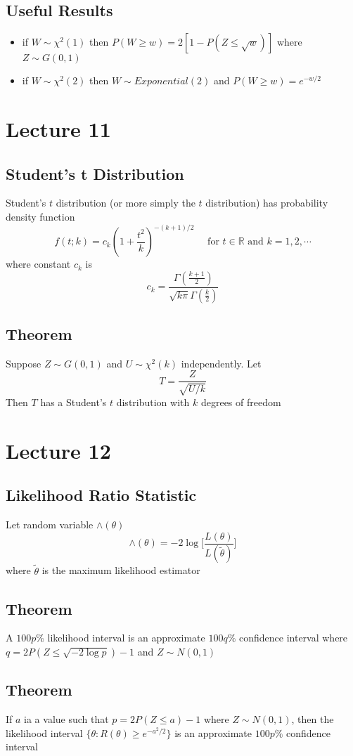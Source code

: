 \documentclass[11pt]{article}
\newcommand{\R}{{\mathbb{R}}}
\begin{document}
\subsection*{Useful Results}
\begin{itemize}
  \item if $W\sim\chi^2(1)$ then $P(W\geq w) = 2[1-P(Z\leq\sqrt{w})]$ where $Z\sim G(0,1)$
  \item if $W\sim\chi^2(2)$ then $W\sim Exponential(2)$ and $P(W\geq w) = e^{-w/2}$
\end{itemize}

\section{Lecture 11}
\subsection{Student's t Distribution}
Student's $t$ distribution (or more simply the $t$ distribution) has probability density function 
\[f(t;k) = c_k(1+\dfrac{t^2}{k})^{-(k+1)/2}\quad\text{ for $t\in\R$ and $k=1,2,\cdots$}\]
where constant $c_k$ is 
\[c_k = \dfrac{\Gamma(\frac{k+1}{2})}{\sqrt{k \pi}\Gamma(\frac{k}{2})}\]
\subsection{Theorem}
Suppose $Z\sim G(0,1)$ and $U\sim\chi^2(k)$ independently. Let 
\[T = \frac{Z}{\sqrt{U/k}}\]
Then $T$ has a Student's $t$ distribution with $k$ degrees of freedom

\section{Lecture 12}
\subsection{Likelihood Ratio Statistic}
Let random variable $\wedge(\theta)$
\[\wedge(\theta) = -2\log\Big[\dfrac{L(\theta)}{L(\tilde{\theta})}\Big]\]
where $\tilde{\theta}$ is the maximum likelihood estimator
\subsection{Theorem}
A $100p\%$ likelihood interval is an approximate $100q\%$ confidence interval where $q=2P(Z\leq\sqrt{-2\log p})-1$ and $Z\sim N(0,1)$
\subsection{Theorem}
If $a$ ia a value such that $p=2P(Z\leq a)-1$ where $Z\sim N(0,1)$, then the likelihood interval $\{\theta:R(\theta)\geq e^{-a^2/2}\}$ is an approximate $100p\%$ confidence interval 
\end{document}

